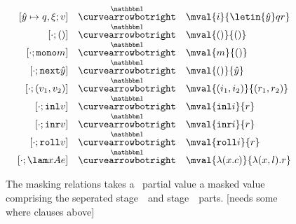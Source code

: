 \begin{figure}
\begin{abstrsyn}
\[\begin{array}{rll}
[\hat y \mapsto q,\xi;v]
  &\vsplito& \mval 
  {i}
  {\letin {\hat y} q {r}} \\\relax
[\cdot;()]
  &\vsplito& \mval 
  {()}
  {()} \\\relax
[\cdot;\monoTerm{m}]
  &\vsplito& \mval 
  {m}
  {()} \\\relax
[\cdot;\next{\hat y}]
  &\vsplito& \mval 
  {()}
  {\hat y} \\\relax
[\cdot;(v_1,v_2)]
  &\vsplito& \mval 
  {(i_1,i_2)}
  {(r_1,r_2)} \\\relax
[\cdot;\inl{v}]
  &\vsplito& \mval 
  {\inl{i}}
  {r} \\\relax
[\cdot;\inr{v}]
  &\vsplito& \mval 
  {\inr{i}}
  {r} \\\relax
[\cdot;\roll{v}]
  &\vsplito& \mval 
  {\roll{i}}
  {r} \\\relax
[\cdot;\lam xAe]
  &\vsplito& \mval 
  {\lambda (x.c)}
  {\lambda (x,l).r}
\end{array}\]
\end{abstrsyn}
\caption{The masking relations takes a \lang\ partial value a masked value
comprising the seperated stage~\bbone\ and stage~\bbtwo\ parts. 
[needs some where clauses above]}
\label{fig:valMask}
\end{figure}

%


